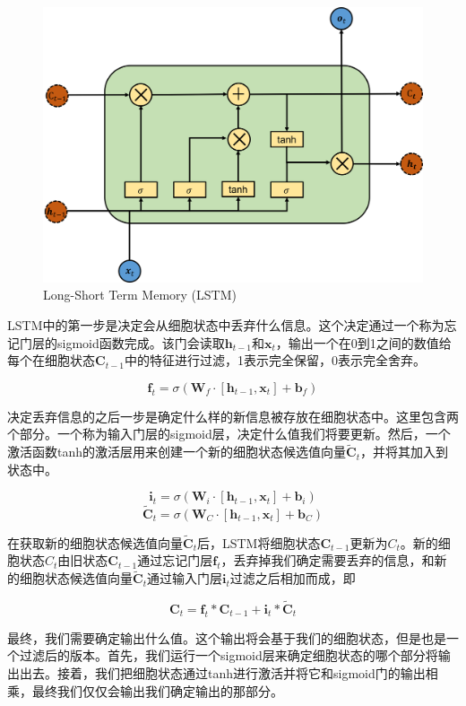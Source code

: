 \documentclass[10pt, titlepage]{article}
\begin{document}
		\begin{figure}[htb]
		\centering
		\includegraphics[width=0.8\columnwidth]{figs/LSTM.png}
		\caption{Long-Short Term Memory (LSTM)}
		\label{fig:LSTM}
		\end{figure}


LSTM中的第一步是决定会从细胞状态中丢弃什么信息。这个决定通过一个称为忘记门层的sigmoid函数完成。该门会读取$\textbf{h}_{t-1}$和$\textbf{x}_t$，输出一个在0到1之间的数值给每个在细胞状态$\textbf{C}_{t-1}$中的特征进行过滤，1表示完全保留，0表示完全舍弃。

$$\textbf{f}_t = \sigma(\textbf{W}_f \cdot [\textbf{h}_{t-1}, \textbf{x}_t] + \textbf{b}_f)$$

决定丢弃信息的之后一步是确定什么样的新信息被存放在细胞状态中。这里包含两个部分。一个称为输入门层的sigmoid层，决定什么值我们将要更新。然后，一个激活函数tanh的激活层用来创建一个新的细胞状态候选值向量$\tilde{\textbf{C}}_t$，并将其加入到状态中。

$$\textbf{i}_t = \sigma(\textbf{W}_i \cdot [\textbf{h}_{t-1}, \textbf{x}_t] + \textbf{b}_i)$$
$$\tilde{\textbf{C}}_t = \sigma(\textbf{W}_C \cdot [\textbf{h}_{t-1}, \textbf{x}_t] + \textbf{b}_C)$$

在获取新的细胞状态候选值向量$\tilde{\textbf{C}}_t$后，LSTM将细胞状态$\textbf{C}_{t-1}$更新为$C_t$。新的细胞状态$C_t$由旧状态$\textbf{C}_{t-1}$通过忘记门层$\textbf{f}_t$，丢弃掉我们确定需要丢弃的信息，和新的细胞状态候选值向量$\tilde{\textbf{C}}_t$通过输入门层$\textbf{i}_t$过滤之后相加而成，即

$$\textbf{C}_t = \textbf{f}_t * \textbf{C}_{t-1} + \textbf{i}_t * \tilde{\textbf{C}}_t$$


最终，我们需要确定输出什么值。这个输出将会基于我们的细胞状态，但是也是一个过滤后的版本。首先，我们运行一个sigmoid层来确定细胞状态的哪个部分将输出出去。接着，我们把细胞状态通过tanh进行激活并将它和sigmoid门的输出相乘，最终我们仅仅会输出我们确定输出的那部分。
\end{document}
